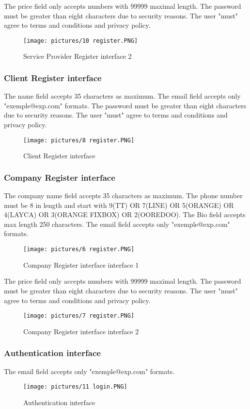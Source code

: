 \documentclass[12pt]{report}
\begin{document}
The price field only accepts numbers with 99999 maximal length.
The password must be greater than eight characters due to security reasons.
The user "must" agree to terms and conditions and privacy policy.
\begin{figure}[!htbp]
    \centering
    \texttt{[image: pictures/10 register.PNG]}
    \caption{Service Provider Register interface 2}
    \label{fig:7}
\end{figure}
\pagebreak
\subsubsection{Client Register interface}
The name field accepts 35 characters as maximum.
The email field accepts only "exemple@exp.com" formats.
The password must be greater than eight characters due to security reasons.
The user "must" agree to terms and conditions and privacy policy.
\begin{figure}[!htbp]
    \centering
    \texttt{[image: pictures/8 register.PNG]}
    \caption{Client Register interface}
    \label{fig:8}
\end{figure}
\pagebreak
\subsubsection{Company Register interface}
The company name field accepts 35 characters as maximum.
The phone number must be 8 in length and start with 9(TT) OR 7(LINE) OR 5(ORANGE) OR 4(LAYCA) OR 3(ORANGE FIXBOX) OR 2(OOREDOO). 
The Bio field accepts max length 250 characters.
The email field accepts only "exemple@exp.com" formats.


\begin{figure}[!htbp]
    \centering
    \texttt{[image: pictures/6 register.PNG]}
    \caption{Company Register interface interface 1}
    \label{fig:9}
\end{figure}

The price field only accepts numbers with 99999 maximal length.
The password must be greater than eight characters due to security reasons.
The user "must" agree to terms and conditions and privacy policy.
\begin{figure}[!htbp]
    \centering
    \texttt{[image: pictures/7 register.PNG]}
    \caption{Company Register interface interface 2}
    \label{fig:10}
\end{figure}
\pagebreak
\subsubsection{Authentication interface}
The email field accepts only "exemple@exp.com" formats.
\begin{figure}[!htbp]
    \centering
    \texttt{[image: pictures/11 login.PNG]}
    \caption{Authentication interface}
    \label{fig:11}
\end{figure}
\end{document}
